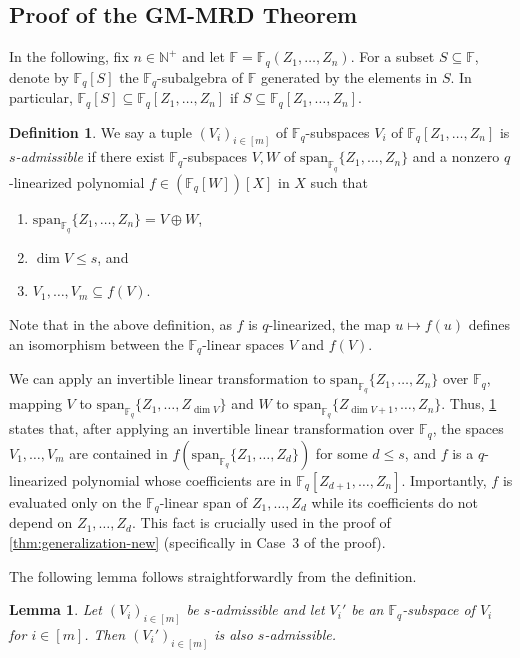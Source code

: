 \documentclass[11pt]{article}
\theoremstyle{plain}
\newtheorem{lemma}[thm]{Lemma}
\theoremstyle{definition}
\newtheorem{defn}[thm]{Definition}
\theoremstyle{remark}
\newcommand{\N}{\mathbb{N}}
\newcommand{\F}{\mathbb{F}}
\begin{document}
\subsection{Proof of the GM-MRD Theorem}

In the following, fix $n\in\N^+$ and let $\F=\F_{q}(Z_1,\dots,Z_{n})$. 
For a subset $S\subseteq \F$, denote by $\F_{q}[S]$ the $\F_q$-subalgebra of $\F$ generated by the elements in $S$. In particular, $\F_q[S]\subseteq \F_q[Z_1,\dots,Z_n]$ if $S\subseteq \F_q[Z_1,\dots,Z_n]$.

\begin{defn}\label{defn:admissible}
We say a tuple $(V_i)_{i\in [m]}$ of $\F_q$-subspaces $V_i$ of $\F_{q}[Z_1,\dots,Z_{n}]$ is \emph{$s$-admissible} if there exist $\F_q$-subspaces $V,W$ of $\mathrm{span}_{\F_q}\{Z_1,\dots,Z_{n}\}$ and a nonzero $q$-linearized polynomial $f\in (\F_q[W])[X]$ in $X$ such that 
\begin{enumerate}
\item $\mathrm{span}_{\F_q}\{Z_1,\dots,Z_{n}\}=V\oplus W$,
\item $\dim V\leq s$, and
\item $V_1,\dots,V_m\subseteq f(V)$.
\end{enumerate}
\end{defn}

Note that in the above definition, as $f$ is $q$-linearized, the map $u\mapsto f(u)$ defines an isomorphism between the $\F_q$-linear spaces $V$ and $f(V)$. 

We can apply an invertible linear transformation to $\mathrm{span}_{\F_q}\{Z_1,\dots,Z_n\}$ over $\F_q$, mapping $V$ to $\mathrm{span}_{\F_q}\{Z_1,\dots,Z_{\dim V}\}$ and $W$ to $\mathrm{span}_{\F_q}\{Z_{\dim V+1},\dots,Z_n\}$.
Thus, \cref{defn:admissible} states that, after applying an invertible linear transformation over $\F_q$, the spaces $V_1,\dots,V_m$ are contained in $f(\mathrm{span}_{\F_q}\{Z_1,\dots,Z_d\})$ for some $d\leq s$, and $f$ is a $q$-linearized polynomial whose coefficients are in $\F_q[Z_{d+1},\dots,Z_n]$.
Importantly, $f$ is evaluated only on the $\F_q$-linear span of $Z_1,\dots,Z_d$ while its coefficients do not depend on $Z_1,\dots,Z_d$. This fact is crucially used in the proof of \cref{thm:generalization-new} (specifically in Case~3 of the proof). 

The following lemma follows straightforwardly from the definition.

\begin{lemma}\label{lem:closed}
Let $(V_i)_{i\in [m]}$ be $s$-admissible and let $V_i'$ be an $\F_q$-subspace of $V_i$ for $i\in [m]$. Then $(V_i')_{i\in [m]}$ is also $s$-admissible.
\end{lemma}
\end{document}
